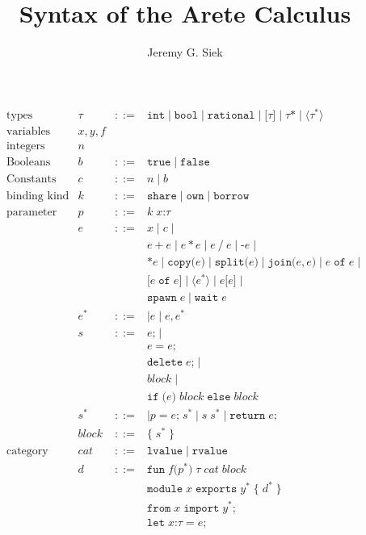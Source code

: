 \documentclass{article}
\title{Syntax of the Arete Calculus}
\author{Jeremy G. Siek}
\newcommand{\SC}{\texttt{;}}
\newcommand{\LC}{\texttt{\{}}
\newcommand{\RC}{\texttt{\}}}
\newcommand{\LP}{\texttt{(}}
\newcommand{\RP}{\texttt{)}}
\newcommand{\LS}{\texttt{[}}
\newcommand{\RS}{\texttt{]}}
\newcommand{\EQ}{\mathop{\texttt{=}}}
\newcommand{\OF}{\mathop{\mathtt{of}}}
\begin{document}
\maketitle

\[
\begin{array}{lrcl}
  \text{types}& \tau & ::= & \mathtt{int} \mid \mathtt{bool} \mid
   \mathtt{rational} \mid
   \LS \tau \RS \mid \tau \texttt{*} \mid \langle \tau^{*} \rangle\\
  \text{variables} & x,y,f \\
  \text{integers} & n \\
  \text{Booleans} & b & ::= & \mathtt{true} \mid \mathtt{false}\\
  \text{Constants} & c & ::= & n \mid b \\
 \text{binding kind} & k &::= & \mathtt{share} \mid \mathtt{own} \mid
        \mathtt{borrow} \\
 \text{parameter} & p &::= & k \; x \texttt{:} \tau \\
  & e &::= & x \mid c \mid\\
  & & & e \mathop{\texttt{+}} e \mid e \mathop{\texttt{*}} e \mid e \mathop{\texttt{/}} e \mid \texttt{-} e \mid \\
  & & & \texttt{*} e \mid \mathtt{copy}\LP e \RP \mid
        \mathtt{split}\LP e \RP \mid \mathtt{join}\LP e,e \RP \mid
        e \OF e \mid \\
  & & & \LS e \OF e \RS \mid \langle e^{*} \rangle \mid e \LS e \RS \mid \\
  & & & \mathtt{spawn}\; e \mid \mathtt{wait}\; e \\
  & e^{*} & ::= & \mid e \mid e \mathop{\texttt{,}} e^{*} \\
  & s &::= & e \SC \mid \\
  & & & e \EQ e\SC\\
  & & & \mathtt{delete}\; e \SC \mid \\
  & & & \mathit{block} \mid \\
  & & & \mathtt{if}\;\LP e \RP\;\mathit{block}\;\mathtt{else}\; \mathit{block}\\
  & s^{*} &::=& \mid p \EQ e\SC \; s^{*} \mid s \; s^{*} \mid \mathtt{return}\; e \SC \\
  & \mathit{block} &::= & \LC\; s^{*} \;\RC \\
  \text{category} & \mathit{cat} & ::= & \mathtt{lvalue} \mid \mathtt{rvalue}\\
  & d & ::= & \mathtt{fun}\; f \LP p^{*} \RP \; \tau \; \mathit{cat} \; \mathit{block}\\
  & & & \mathtt{module} \; x \;\mathtt{exports}\; y^{*} \; \LC\; d^{*} \;\RC\\
  & & & \mathtt{from} \; x \; \mathtt{import}\; y^{*} \SC\\
  & & & \mathtt{let}\; x \texttt{:} \tau \EQ e \SC 
\end{array}
\]
\end{document}
